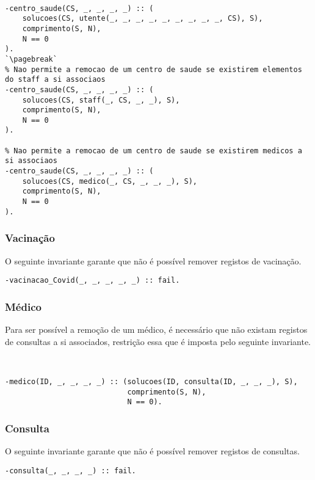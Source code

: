 \

\begin{lstlisting}[caption={Invariantes de remoção relativos ao predicado \texttt{centro\_saude}}]
% Nao permite a remocao de um centro de saude se existirem utentes a si associaos
-centro_saude(CS, _, _, _, _) :: (
    solucoes(CS, utente(_, _, _, _, _, _, _, _, _, CS), S),
    comprimento(S, N),
    N == 0
).
`\pagebreak`
% Nao permite a remocao de um centro de saude se existirem elementos do staff a si associaos
-centro_saude(CS, _, _, _, _) :: (
    solucoes(CS, staff(_, CS, _, _), S),
    comprimento(S, N),
    N == 0
).

% Nao permite a remocao de um centro de saude se existirem medicos a si associaos
-centro_saude(CS, _, _, _, _) :: (
    solucoes(CS, medico(_, CS, _, _, _), S),
    comprimento(S, N),
    N == 0
).
\end{lstlisting}

\subsubsection*{Vacinação}
O seguinte invariante garante que não é possível remover registos de vacinação.

\begin{lstlisting}[caption={Invariante de remoção relativos ao predicado 
\texttt{vacinacao\_covid}}]
% Nao permite a remocao de registos de atos de vacinacao
-vacinacao_Covid(_, _, _, _, _) :: fail.
\end{lstlisting}

\subsubsection*{Médico}
Para ser possível a remoção de um médico, é necessário que não existam registos de consultas 
a si associados, restrição
essa que é imposta pelo seguinte invariante.

\

\begin{lstlisting}[caption={Invariante de remoção relativo ao predicado \texttt{medico}}]
% Nao permite a remocao de um medico se existirem consultas a si associadas
-medico(ID, _, _, _, _) :: (solucoes(ID, consulta(ID, _, _, _), S),
                            comprimento(S, N),
                            N == 0).
\end{lstlisting}

\subsubsection*{Consulta}
O seguinte invariante garante que não é possível remover registos de consultas.
\
\begin{lstlisting}[caption={Invariante de remoção relativo ao predicado \texttt{consulta}}]
% Nao permite a remocao de registos de consultas
-consulta(_, _, _, _) :: fail.
\end{lstlisting}
